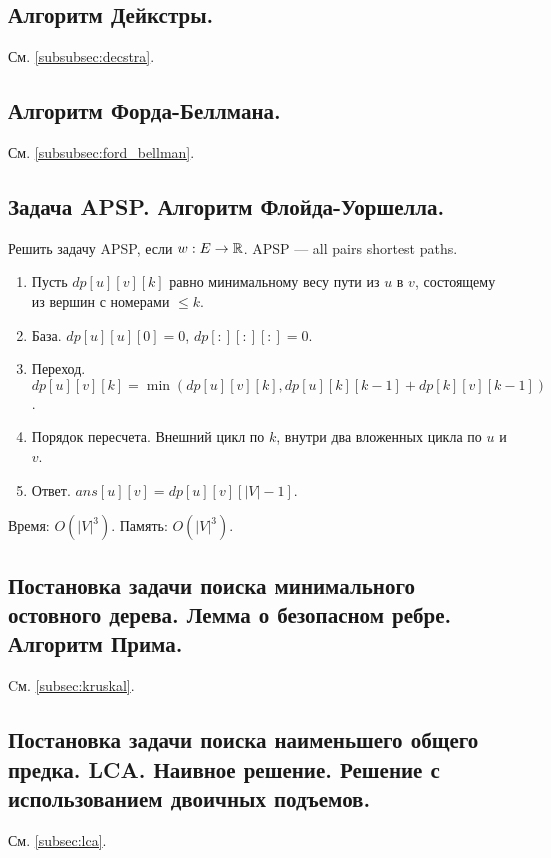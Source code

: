 \documentclass[a4paper,14pt]{article}
\begin{document}
    \subsection{Алгоритм Дейкстры.}
    См. \ref{subsubsec:decstra}.
    \subsection{Алгоритм Форда-Беллмана.}
    См. \ref{subsubsec:ford_bellman}.
    \subsection{Задача APSP. Алгоритм Флойда-Уоршелла.}
    \begin{problem}
        Решить задачу APSP, если $w : E \rightarrow \mathbb{R}$.
        APSP — all pairs shortest paths.
    \end{problem}
    \begin{enumerate}
        \item Пусть $dp[u][v][k]$ равно минимальному весу пути из $u$ в $v$,
        состоящему из вершин с номерами $\leqslant k$.
        \item База. $dp[u][u][0] = 0$, $dp[:][:][:] = 0$.
        \item Переход. $dp[u][v][k] = \min(dp[u][v][k], dp[u][k][k-1] + dp[k][v][k-1])$.
        \item Порядок пересчета. Внешний цикл по $k$, внутри два вложенных цикла по $u$ и $v$.
        \item Ответ. $ans[u][v] = dp[u][v][|V|-1]$.
    \end{enumerate}
    Время: $O(|V|^3)$. Память: $O(|V|^3)$.

    \subsection{Постановка задачи поиска минимального остовного дерева. Лемма о безопасном ребре. Алгоритм Прима.}
    Cм. \ref{subsec:kruskal}.
    \subsection{Постановка задачи поиска наименьшего общего предка. LCA. Наивное решение. Решение с использованием двоичных подъемов.}
    См. \ref{subsec:lca}.
\end{document}
